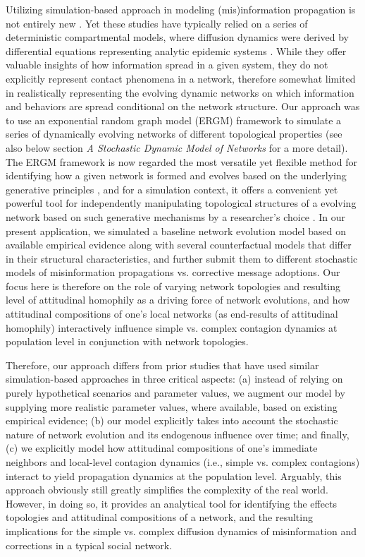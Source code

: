 \documentclass[man, 12pt, a4paper, nolmodern, noextraspace]{apa6}
\begin{document}
    Utilizing simulation-based approach in modeling (mis)information propagation is not entirely new \parencite[e.g.,][]{tambuscio2015fact, jin2013epidemiological, zhao2010weak}. Yet these studies have typically relied on a series of deterministic compartmental models, where diffusion dynamics were derived by differential equations representing analytic epidemic systems \parencite[e.g., see][]{zhao2010weak}. While they offer valuable insights of how information spread in a given system, they do not explicitly represent contact phenomena in a network, therefore somewhat limited in realistically representing the evolving dynamic networks on which information and behaviors are spread conditional on the network structure. Our approach was to use an exponential random graph model (ERGM) framework \parencite{robins2007introduction, morris2008specification} to simulate a series of dynamically evolving networks of different topological properties (see also below section \textit{A Stochastic Dynamic Model of Networks} for a more detail). The ERGM framework is now regarded the most versatile yet flexible method for identifying how a given network is formed and evolves based on the underlying generative principles \parencite{cranmer2017navigating, robins2007introduction}, and for a simulation context, it offers a convenient yet powerful tool for independently manipulating topological structures of a evolving network based on such generative mechanisms by a researcher's choice \parencite{morris2008specification, leifeld2017temporal}. In our present application, we simulated a baseline network evolution model based on available empirical evidence along with several counterfactual models that differ in their structural characteristics, and further submit them to different stochastic models of misinformation propagations vs. corrective message adoptions. Our focus here is therefore on the role of varying network topologies and resulting level of attitudinal homophily as a driving force of network evolutions, and how attitudinal compositions of one's local networks (as end-results of attitudinal homophily) interactively influence simple vs. complex contagion dynamics at population level in conjunction with network topologies.
    
    Therefore, our approach differs from prior studies that have used similar simulation-based approaches in three critical aspects: (a) instead of relying on purely hypothetical scenarios and parameter values, we augment our model by supplying more realistic parameter values, where available, based on existing empirical evidence; (b) our model explicitly takes into account the stochastic nature of network evolution and its endogenous influence over time; and finally, (c) we explicitly model how attitudinal compositions of one's immediate neighbors and local-level contagion dynamics (i.e., simple vs. complex contagions) interact to yield propagation dynamics at the population level. Arguably, this approach obviously still greatly simplifies the complexity of the real world. However, in doing so, it provides an analytical tool for identifying the effects topologies and attitudinal compositions of a network, and the resulting implications for the simple vs. complex diffusion dynamics of misinformation and corrections in a typical social network.
\end{document}
